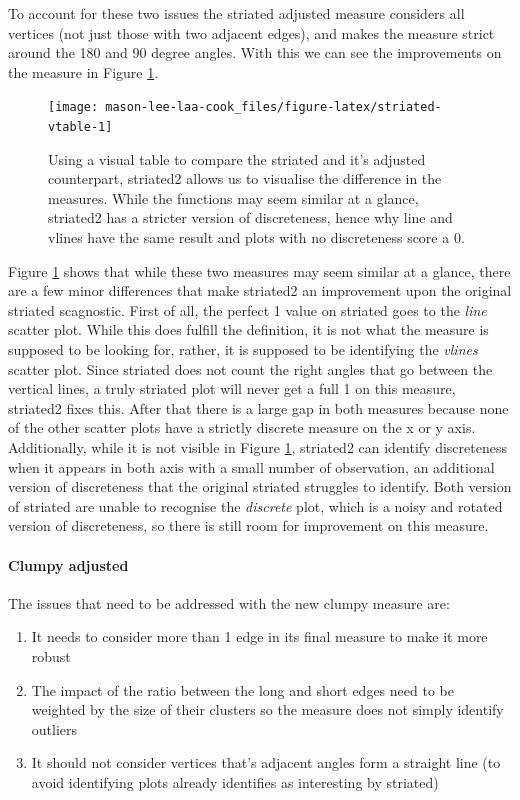To account for these two issues the striated adjusted measure considers all vertices (not just those with two adjacent edges), and makes the measure strict around the 180 and 90 degree angles. With this we can see the improvements on the measure in Figure \ref{fig:striated-vtable}.

\begin{figure}
\texttt{[image: mason-lee-laa-cook\_files/figure-latex/striated-vtable-1]} \caption{Using a visual table to compare the striated and it's adjusted counterpart, striated2 allows us to visualise the difference in the measures. While the functions may seem similar at a glance, striated2 has a stricter version of discreteness, hence why line and vlines have the same result and plots with no discreteness score a 0.}\label{fig:striated-vtable}
\end{figure}

Figure \ref{fig:striated-vtable} shows that while these two measures may seem similar at a glance, there are a few minor differences that make striated2 an improvement upon the original striated scagnostic. First of all, the perfect 1 value on striated goes to the \emph{line} scatter plot. While this does fulfill the definition, it is not what the measure is supposed to be looking for, rather, it is supposed to be identifying the \emph{vlines} scatter plot. Since striated does not count the right angles that go between the vertical lines, a truly striated plot will never get a full 1 on this measure, striated2 fixes this. After that there is a large gap in both measures because none of the other scatter plots have a strictly discrete measure on the x or y axis. Additionally, while it is not visible in Figure \ref{fig:striated-vtable}, striated2 can identify discreteness when it appears in both axis with a small number of observation, an additional version of discreteness that the original striated struggles to identify. Both version of striated are unable to recognise the \emph{discrete} plot, which is a noisy and rotated version of discreteness, so there is still room for improvement on this measure.

\hypertarget{clumpy-adjusted}{%
\paragraph{Clumpy adjusted}\label{clumpy-adjusted}}

The issues that need to be addressed with the new clumpy measure are:

\begin{enumerate}
\def\labelenumi{\arabic{enumi}.}
\tightlist
\item
  It needs to consider more than 1 edge in its final measure to make it more robust
\item
  The impact of the ratio between the long and short edges need to be weighted by the size of their clusters so the measure does not simply identify outliers
\item
  It should not consider vertices that's adjacent angles form a straight line (to avoid identifying plots already identifies as interesting by striated)
\end{enumerate}


